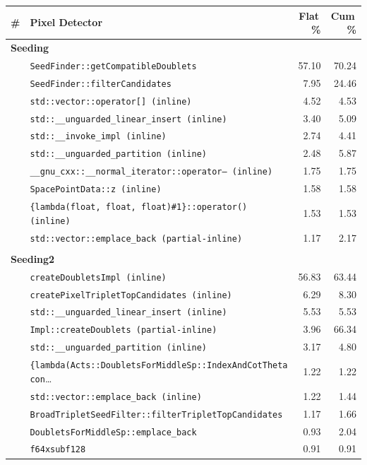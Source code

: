\begin{tabular}{rlrr}
\toprule
\textbf{\#} & \textbf{Pixel Detector} & \textbf{Flat\,\%} & \textbf{Cum\,\%} \\
\midrule
\multicolumn{4}{l}{\textbf{Seeding}} \\
\quad & \texttt{SeedFinder::getCompatibleDoublets} & 57.10 & 70.24 \\
\quad & \texttt{SeedFinder::filterCandidates} & 7.95 & 24.46 \\
\quad & \texttt{std::vector::operator[] (inline)} & 4.52 & 4.53 \\
\quad & \texttt{std::\_\_unguarded\_linear\_insert (inline)} & 3.40 & 5.09 \\
\quad & \texttt{std::\_\_invoke\_impl (inline)} & 2.74 & 4.41 \\
\quad & \texttt{std::\_\_unguarded\_partition (inline)} & 2.48 & 5.87 \\
\quad & \texttt{\_\_gnu\_cxx::\_\_normal\_iterator::operator-- (inline)} & 1.75 & 1.75 \\
\quad & \texttt{SpacePointData::z (inline)} & 1.58 & 1.58 \\
\quad & \texttt{\{lambda(float, float, float)\#1\}::operator() (inline)} & 1.53 & 1.53 \\
\quad & \texttt{std::vector::emplace\_back (partial-inline)} & 1.17 & 2.17 \\
\\[-0.5em]
\multicolumn{4}{l}{\textbf{Seeding2}} \\
\quad & \texttt{createDoubletsImpl (inline)} & 56.83 & 63.44 \\
\quad & \texttt{createPixelTripletTopCandidates (inline)} & 6.29 & 8.30 \\
\quad & \texttt{std::\_\_unguarded\_linear\_insert (inline)} & 5.53 & 5.53 \\
\quad & \texttt{Impl::createDoublets (partial-inline)} & 3.96 & 66.34 \\
\quad & \texttt{std::\_\_unguarded\_partition (inline)} & 3.17 & 4.80 \\
\quad & \texttt{\{lambda(Acts::DoubletsForMiddleSp::IndexAndCotTheta con}\ldots & 1.22 & 1.22 \\
\quad & \texttt{std::vector::emplace\_back (inline)} & 1.22 & 1.44 \\
\quad & \texttt{BroadTripletSeedFilter::filterTripletTopCandidates} & 1.17 & 1.66 \\
\quad & \texttt{DoubletsForMiddleSp::emplace\_back} & 0.93 & 2.04 \\
\quad & \texttt{f64xsubf128} & 0.91 & 0.91 \\
\bottomrule
\end{tabular}
